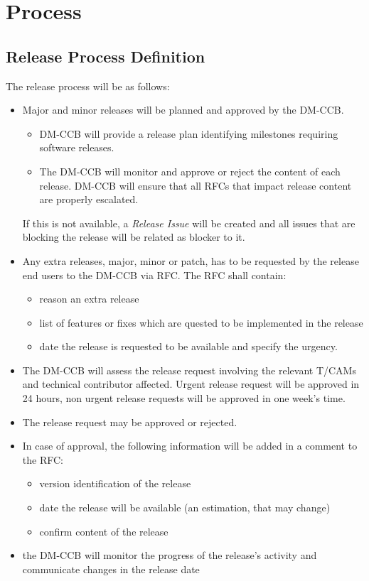 \section{Process} \label{sec:process}

\subsection{Release Process Definition}

The release process will be as follows:

\begin{itemize}
\item Major and minor releases will be planned and approved by the DM-CCB.
\begin{itemize}
  \item  DM-CCB will provide  a release plan identifying  milestones requiring software releases.
  \item The DM-CCB will monitor and approve or reject the content of each release. DM-CCB will ensure that  all RFCs that impact  release content are properly escalated.
\end{itemize}
If this is not available, a \textit{Release Issue} will be created and all issues that are blocking the release will be related as blocker to it.
\item Any extra releases, major, minor or patch, has to be requested by the release end users to the DM-CCB via \gls{RFC}. The \gls{RFC} shall contain:
\begin{itemize}
  \item reason an extra release
  \item list of features or fixes which are quested to be implemented in the release
  \item date the release is requested to be available and specify the urgency.
\end{itemize}
\item The DM-CCB will assess the release request involving the relevant T/CAMs and technical contributor affected.
Urgent release request will be approved in 24 hours, non urgent release requests will be approved in one week's time.
\item The release request may be approved or rejected.
\item In case of approval, the following information will be added in a comment to the RFC:
\begin{itemize}
  \item version identification of the release
  \item date the release will be available (an estimation, that may change)
  \item confirm content of the release
\end{itemize}
\item the DM-CCB will monitor the progress of the release's activity and communicate changes in the release date
\end{itemize}


